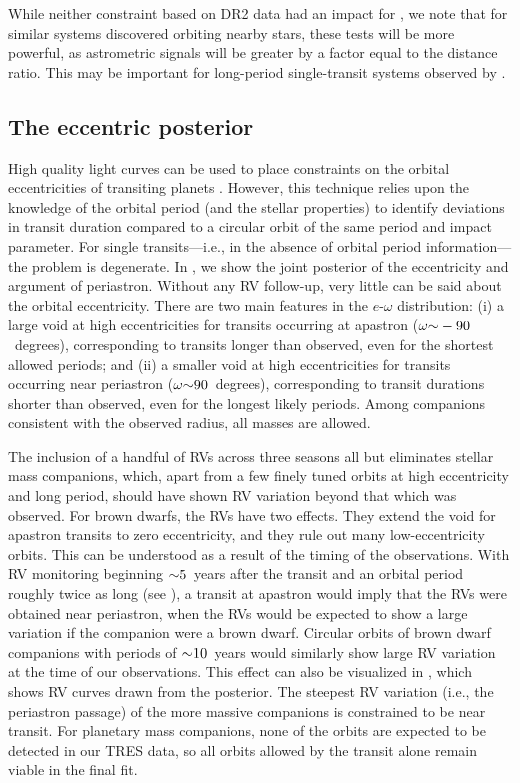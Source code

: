 \documentclass[twocolumn]{aastex63}
\begin{document}
While neither constraint based on DR2 data had an impact for \thisstar, we note that for similar systems discovered orbiting nearby stars, these tests will be more powerful, as astrometric signals will be greater by a factor equal to the distance ratio. This may be important for long-period single-transit systems observed by \tess.

\subsection{The eccentric posterior}
\label{sec:ew}

High quality light curves can be used to place constraints on the orbital eccentricities of transiting planets \citep[e.g.,][]{ford:2008,dawson:2012}. However, this technique relies upon the knowledge of the orbital period (and the stellar properties) to identify deviations in transit duration compared to a circular orbit of the same period and impact parameter. For single transits---i.e., in the absence of orbital period information--- the problem is degenerate. In , we show the joint posterior of the eccentricity and argument of periastron. Without any RV follow-up, very little can be said about the orbital eccentricity. There are two main features in the $e$-$\omega$ distribution: (i) a large void at high eccentricities for transits occurring at apastron ($\omega \mathord{\sim} -90$\ degrees), corresponding to transits longer than observed, even for the shortest allowed periods; and (ii) a smaller void at high eccentricities for transits occurring near periastron ($\omega \mathord{\sim} 90$\ degrees), corresponding to transit durations shorter than observed, even for the longest likely periods. Among companions consistent with the observed radius, all masses are allowed.

The inclusion of a handful of RVs across three seasons all but eliminates stellar mass companions, which, apart from a few finely tuned orbits at high eccentricity and long period, should have shown RV variation beyond that which was observed. For brown dwarfs, the RVs have two effects. They extend the void for apastron transits to zero eccentricity, and they rule out many low-eccentricity orbits. This can be understood as a result of the timing of the observations. With RV monitoring beginning $\mathord{\sim} 5$\ years after the transit and an orbital period roughly twice as long (see ), a transit at apastron would imply that the RVs were obtained near periastron, when the RVs would be expected to show a large variation if the companion were a brown dwarf. Circular orbits of brown dwarf companions with periods of $\mathord{\sim} 10$\ years would similarly show large RV variation at the time of our observations. This effect can also be visualized in , which shows RV curves drawn from the posterior. The steepest RV variation (i.e., the periastron passage) of the more massive companions is constrained to be near transit. For planetary mass companions, none of the orbits are expected to be detected in our TRES data, so all orbits allowed by the transit alone remain viable in the final fit.
\end{document}

